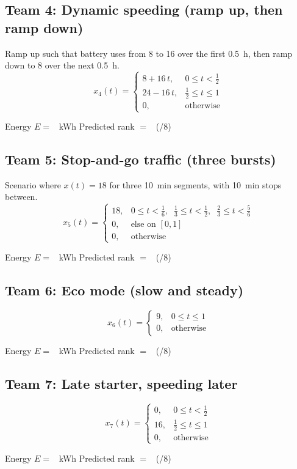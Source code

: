 \subsection*{Team 4: Dynamic speeding (ramp up, then ramp down)}
Ramp up such that battery uses from 8 to 16 over the first \SI{0.5}{h}, then ramp down to 8 over the next \SI{0.5}{h}.
\[
x_4(t)=
\begin{cases}
8 + 16\,t, & 0 \le t < \tfrac{1}{2} \\
24 - 16\,t, & \tfrac{1}{2} \le t \le 1 \\
0, & \text{otherwise}
\end{cases}
\]
\begin{tcolorbox}[title=Team 4: Record your results]
Energy \(E=\) \Eblank\ \si{kWh} \quad\quad Predicted rank \(=\) \Rankblank\ (/8)
\end{tcolorbox}

\subsection*{Team 5: Stop-and-go traffic (three bursts)}
Scenario where $x(t) = 18$ for three \SI{10}{min} segments, with \SI{10}{min} stops between.
\[
x_5(t)=
\begin{cases}
18, & 0 \le t < \tfrac{1}{6}, \;\;\tfrac{1}{3}\le t < \tfrac{1}{2}, \;\;\tfrac{2}{3}\le t < \tfrac{5}{6} \\
0,  & \text{else on }[0,1]\\
0,  & \text{otherwise}
\end{cases}
\]
\begin{tcolorbox}[title=Team 5: Record your results]
Energy \(E=\) \Eblank\ \si{kWh} \quad\quad Predicted rank \(=\) \Rankblank\ (/8)
\end{tcolorbox}

\subsection*{Team 6: Eco mode (slow and steady)}
\[
x_6(t)=
\begin{cases}
9, & 0 \le t \le 1 \\
0, & \text{otherwise}
\end{cases}
\]
\begin{tcolorbox}[title=Team 6: Record your results]
Energy \(E=\) \Eblank\ \si{kWh} \quad\quad Predicted rank \(=\) \Rankblank\ (/8)
\end{tcolorbox}

\subsection*{Team 7: Late starter, speeding later}
\[
x_7(t)=
\begin{cases}
0, & 0 \le t < \tfrac{1}{2} \\
16, & \tfrac{1}{2} \le t \le 1 \\
0, & \text{otherwise}
\end{cases}
\]
\begin{tcolorbox}[title=Team 7: Record your results]
Energy \(E=\) \Eblank\ \si{kWh} \quad\quad Predicted rank \(=\) \Rankblank\ (/8)
\end{tcolorbox}

